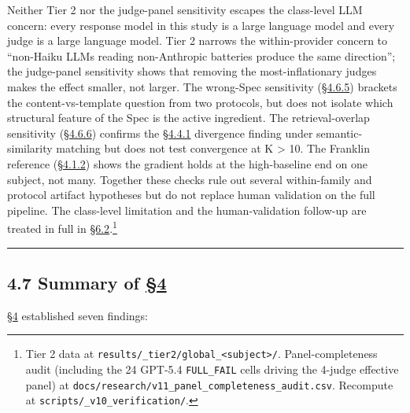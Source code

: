 Neither Tier 2 nor the judge-panel sensitivity escapes the class-level
LLM concern: every response model in this study is a large language
model and every judge is a large language model. Tier 2 narrows the
within-provider concern to ``non-Haiku LLMs reading non-Anthropic
batteries produce the same direction''; the judge-panel sensitivity
shows that removing the most-inflationary judges makes the effect
smaller, not larger. The wrong-Spec sensitivity (\hyperref[wrong-spec-derangement-protocol-sensitivity]{§4.6.5}) brackets the
content-vs-template question from two protocols, but does not isolate
which structural feature of the Spec is the active ingredient. The
retrieval-overlap sensitivity (\hyperref[retrieval-overlap-sensitivity-semantic-similarity-matching-k-variation]{§4.6.6}) confirms the \hyperref[cross-system-retrieval-providers-do-not-converge]{§4.4.1} divergence
finding under semantic-similarity matching but does not test convergence
at K \textgreater{} 10. The Franklin reference (\hyperref[the-gradient-at-the-high-baseline-end-franklin-reference]{§4.1.2}) shows the
gradient holds at the high-baseline end on one subject, not many.
Together these checks rule out several within-family and protocol
artifact hypotheses but do not replace human validation on the full
pipeline. The class-level limitation and the human-validation follow-up
are treated in full in \hyperref[measurement-apparatus]{§6.2}.\footnote{Tier 2 data at
  \texttt{results/\_tier2/global\_\textless{}subject\textgreater{}/}.
  Panel-completeness audit (including the 24 GPT-5.4 \texttt{FULL\_FAIL}
  cells driving the 4-judge effective panel) at
  \texttt{docs/research/v11\_panel\_completeness\_audit.csv}. Recompute
  at \texttt{scripts/\_v10\_verification/}.}

\begin{center}\rule{0.5\linewidth}{0.5pt}\end{center}

\hypertarget{summary-of-4}{%
\subsection{4.7 Summary of \hyperref[results]{§4}}\label{summary-of-4}}

\hyperref[results]{§4} established seven findings:

